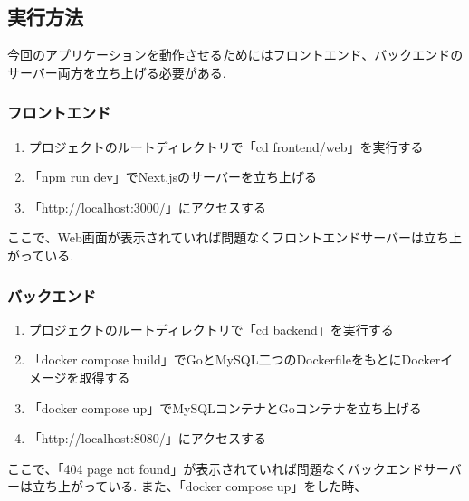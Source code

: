 \documentclass[submit,techrep]{ipsj}
\begin{document}
  \subsection{実行方法}
今回のアプリケーションを動作させるためにはフロントエンド、バックエンドのサーバー両方を立ち上げる必要がある.
\subsubsection{フロントエンド}
\begin{enumerate}
  \item プロジェクトのルートディレクトリで「cd frontend/web」を実行する
  \item 「npm run dev」でNext.jsのサーバーを立ち上げる
  \item  「http://localhost:3000/」にアクセスする
  \end{enumerate}
ここで、Web画面が表示されていれば問題なくフロントエンドサーバーは立ち上がっている.
  
\subsubsection{バックエンド}

\begin{enumerate}
  \item プロジェクトのルートディレクトリで「cd backend」を実行する
    \item 「docker compose build」でGoとMySQL二つのDockerfileをもとにDockerイメージを取得する
  \item 「docker compose up」でMySQLコンテナとGoコンテナを立ち上げる
  \item  「http://localhost:8080/」にアクセスする
  \end{enumerate}
  ここで、「404 page not found」が表示されていれば問題なくバックエンドサーバーは立ち上がっている.
  また、「docker compose up」をした時、
  
\end{document}
